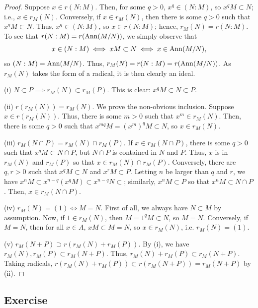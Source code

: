 \begin{proof}
Suppose $x \in r(N:M)$. Then, for some $q > 0$, $x^q \in (N:M)$, so $x^q M \subset N$; i.e., $x \in r_M(N)$. Conversely, if $x \in r_M(N)$,
then there is some $q > 0$ such that $x^q M \subset N$. Thus, $x^q \in (N:M)$, so $x \in r(N:M)$; hence, $r_M(N) = r(N:M)$. To see that 
$r(N:M) = r(\operatorname{Ann}(M/N))$, we simply observe that
$$x \in (N:M) \iff xM \subset N \iff x \in \operatorname{Ann}(M/N),$$
so $(N:M) = \operatorname{Ann}(M/N)$. Thus, $r_M(N) = r(N:M) = r(\operatorname{Ann}(M/N))$. As $r_M(N)$ takes the form of a radical, it is then clearly an ideal.

(i) $N \subset P \implies r_M(N) \subset r_M(P)$. This is clear: $x^q M \subset N \subset P$.

(ii) $r(r_M(N)) = r_M(N)$. We prove the non-obvious inclusion. Suppose $x \in r(r_M(N))$. Thus, there is some $m > 0$ such that $x^m \in r_M(N)$. Then, there
is some $q > 0$ such that $x^{mq}M = (x^m)^q M \subset N$, so $x \in r_M(N)$.

(iii) $r_M(N \cap P) = r_M(N) \cap r_M(P)$. If $x \in r_M(N \cap P)$, there is some $q > 0$ such that $x^q M \subset N \cap P$, but $N \cap P$ is contained in $N$ and $P$. Thus,
$x$ is in $r_M(N)$ and $r_M(P)$ so that $x \in r_M(N) \cap r_M(P)$. Conversely, there are $q,r > 0$ such that $x^q M \subset N$ and $x^r M \subset P$. Letting $n$ be larger than $q$
and $r$, we have $x^n M \subset x^{n-q} (x^q M) \subset x^{n-q} N \subset$; similarly, $x^n M \subset P$ so that $x^n M \subset N \cap P$. Then, $x \in r_M(N \cap P)$.

(iv) $r_M(N) = (1) \iff M = N$. First of all, we always have $N \subset M$ by assumption. Now, if $1 \in r_M(N)$, then $M = 1^q M \subset N$, so $M = N$. Conversely, if $M = N$, then
for all $x \in A$, $xM \subset M = N$, so $x \in r_M(N)$, i.e. $r_M(N) = (1)$.

(v) $r_M(N + P) \supset r(r_M(N) + r_M(P))$. By (i), we have $r_M(N), r_M(P) \subset r_M(N + P)$. Thus, $r_M(N) + r_M(P) \subset r_M(N + P)$. Taking radicals,
$r(r_M(N) + r_M(P)) \subset r(r_M(N+P)) = r_M(N+P)$ by (ii).
\end{proof}

\subsection{Exercise}\label{4.21}

